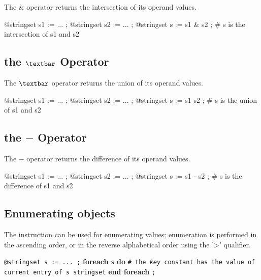 The \emph{$\&$} operator returns the intersection of its operand values.

\exempleTroisLignes
{}
{@stringset s1 := ... ;}
{@stringset s2 := ... ;}
{@stringset s := s1 \& s2 ; \# s is the intersection of s1 and s2}






\subsection{the \emph{$\textbar$} Operator}

The \emph{$\textbar$} operator returns the union of its operand values.

\exempleTroisLignes
{}
{@stringset s1 := ... ;}
{@stringset s2 := ... ;}
{@stringset s := s1 \textbar s2 ; \# s is the union of s1 and s2}






\subsection{the \emph{$-$} Operator}

The \emph{$-$} operator returns the difference of its operand values.

\exempleTroisLignes
{}
{@stringset s1 := ... ;}
{@stringset s2 := ... ;}
{@stringset s := s1 - s2 ; \# s is the difference of s1 and s2}








\subsection{Enumerating  objects}


The  instruction can be used for enumerating  values; enumeration is performed in the ascending order, or in the reverse alphabetical order using the '>' qualifier.

\texttt{@stringset s := ... ;}\newline
\textbf{foreach} \texttt {s} \textbf {do}\newline
\texttt{\# the \emph{key} constant has the value of current entry of \emph{s} stringset}\newline
\textbf{end foreach} \texttt{;}







